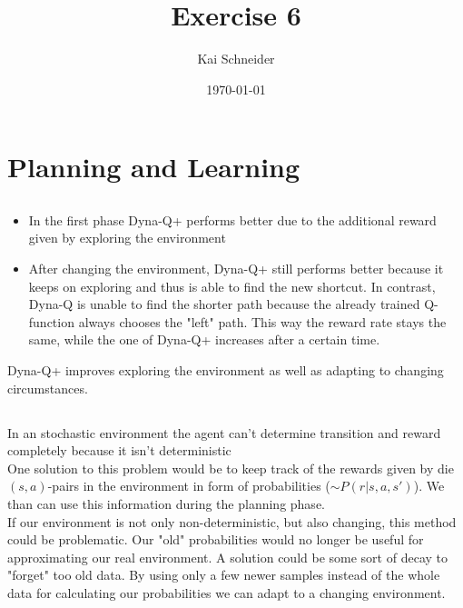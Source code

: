 \documentclass[11pt,a4paper]{article}
\title{Exercise 6}
\author{Kai Schneider}
\date{\today}
\begin{document}
 

\maketitle

\section{Planning and Learning}

\subsection{}

\begin{itemize}
  \item In the first phase Dyna-Q+ performs better due to the additional reward given by exploring the environment
  \item After changing the environment, Dyna-Q+ still performs better because it keeps on exploring and thus is able to find
  the new shortcut. In contrast, Dyna-Q is unable to find the shorter path because the already trained Q-function always chooses
  the "left" path. This way the reward rate stays the same, while the one of Dyna-Q+ increases after a certain time.
\end{itemize}
Dyna-Q+ improves exploring the environment as well as adapting to changing circumstances.



\subsection{}

In an stochastic environment the agent can't determine transition and reward completely because it isn't deterministic\\
One solution to this problem would be to keep track of the rewards given by die $(s,a)$-pairs in the environment in form of 
probabilities ($\sim P(r|s,a,s')$). We than can use this information during the planning phase.\\
If our environment is not only non-deterministic, but also changing, this method could be problematic. Our "old" probabilities
would no longer be useful for approximating our real environment. A solution could be some sort of decay to "forget" too old data. 
By using only a few newer samples instead of the whole data for calculating our probabilities we can adapt to a changing environment.
\end{document}
